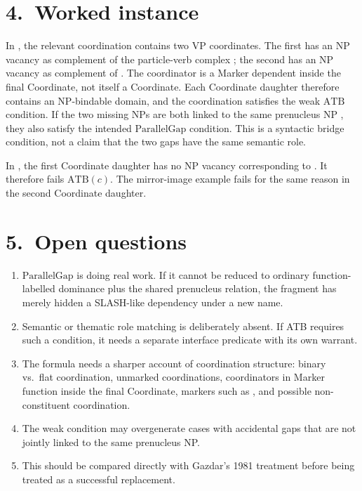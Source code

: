 \documentclass[11pt]{article}
\newcommand{\ATB}{\mathrm{ATB}}
\newcommand{\ParallelGap}{\mathrm{ParallelGap}}
\begin{document}
\section*{4.~Worked instance}

In , the relevant coordination
contains two VP coordinates. The first has an NP vacancy as complement of the
particle-verb complex ; the second has an NP vacancy as
complement of . The coordinator  is a Marker dependent
inside the final Coordinate, not itself a Coordinate. Each Coordinate daughter
therefore contains an NP-bindable domain, and the coordination satisfies the
weak $\ATB$ condition. If the two missing NPs are both linked to the same
prenucleus NP , they also satisfy the intended $\ParallelGap$
condition. This is a syntactic bridge condition, not a claim that the two gaps
have the same semantic role.

In , the first Coordinate
daughter has no NP vacancy corresponding to . It therefore fails
$\ATB(c)$. The mirror-image example fails for the same reason in the second
Coordinate daughter.

\section*{5.~Open questions}

\begin{enumerate}[label=(\alph*),leftmargin=2em,itemsep=0.25em]
  \item $\ParallelGap$ is doing real work. If it cannot be reduced to ordinary
        function-labelled dominance plus the shared prenucleus relation, the
        fragment has merely hidden a SLASH-like dependency under a new name.
  \item Semantic or thematic role matching is deliberately absent. If ATB
        requires such a condition, it needs a separate interface predicate with
        its own warrant.
  \item The formula needs a sharper account of coordination structure:
        binary vs.\ flat coordination, unmarked coordinations, coordinators in
        Marker function inside the final Coordinate, markers such as
        , and possible non-constituent coordination.
  \item The weak condition may overgenerate cases with accidental gaps that
        are not jointly linked to the same prenucleus NP.
  \item This should be compared directly with Gazdar's 1981 treatment before
        being treated as a successful replacement.
\end{enumerate}
\end{document}
